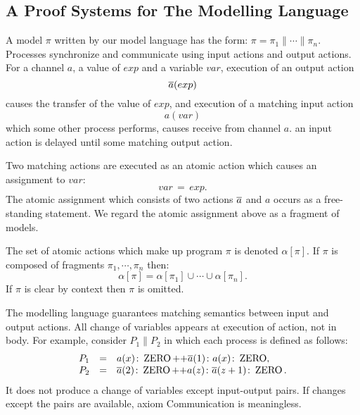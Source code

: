 \documentclass[12pt,a4paper,titlepage]{article}
\theoremstyle{break}
\begin{document}
\subsection{A Proof Systems for The Modelling Language}\label{sec:ProofSystems}
A model \(\pi\) written by our model language has the form: \(\pi=\pi_1\|\cdots\|\pi_n\).
Processes synchronize and communicate using input actions and output actions.
For a channel \(a\), a value of \(exp\) and a variable \(var\), execution of an output action
  \begin{displaymath}
\mbox{$\overline{a}$}(exp)
  \end{displaymath}
causes the transfer of the value of \(exp\), and execution of a matching input action 
  \begin{displaymath}
a(var)
  \end{displaymath}
which some other process performs, causes receive from channel \(a\).
an input action is delayed until some matching output action.

Two matching actions are executed as an atomic action which causes an assignment to \(var\):
  \begin{displaymath}
var\,=\,exp.
  \end{displaymath}
The atomic assignment which consists of two actions \(\mbox{$\overline{a}$}\) and \(a\) occurs as a free-standing statement.
We regard the atomic assignment above as a fragment of models.

The set of atomic actions which make up program \(\pi\) is denoted \(\alpha[\pi]\).
If \(\pi\) is composed of fragments \(\pi_1,\cdots,\pi_n\) then:
  \begin{displaymath}
\alpha[\pi]=\alpha[\pi_1]\cup\cdots\cup\alpha[\pi_n].
  \end{displaymath}
If \(\pi\) is clear by context then \(\pi\) is omitted.

The modelling language guarantees matching semantics between input and output actions.
All change of variables appears at execution of action, not in body.
For example, consider \(P_1\|P_2\) in which each process is defined as follows:
  \begin{displaymath}
    \begin{array}{lcl}
P_1&=&a(x)\colon\mathop{\mathrm{ZERO}}\nolimits\mbox{++}\mbox{$\overline{a}$}(1)\colon a(x)\colon\mathop{\mathrm{ZERO}}\nolimits,\\
P_2&=&\mbox{$\overline{a}$}(2)\colon\mathop{\mathrm{ZERO}}\nolimits\mbox{++}a(z)\colon\mbox{$\overline{a}$}(z+1)\colon\mathop{\mathrm{ZERO}}\nolimits.
    \end{array}
  \end{displaymath}
It does not produce a change of variables except input-output pairs.
If changes except the pairs are available, axiom Communication is meaningless.
\end{document}
